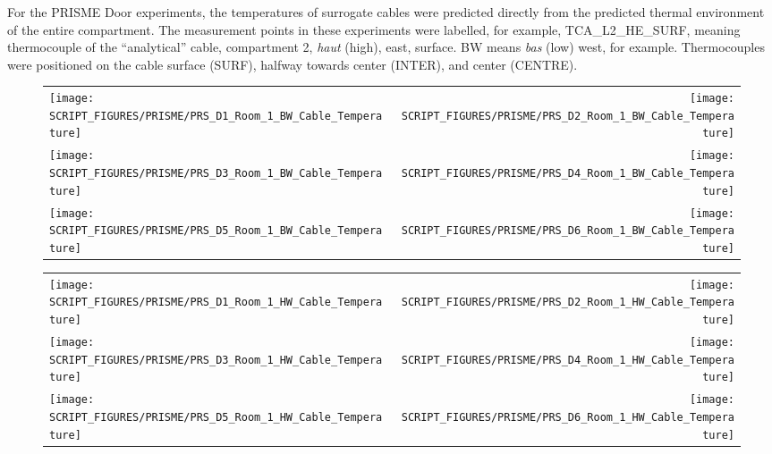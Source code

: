 \clearpage

For the PRISME Door experiments, the temperatures of surrogate cables were predicted directly from the predicted thermal environment of the entire compartment. The measurement points in these experiments were labelled, for example, TCA\_L2\_HE\_SURF, meaning thermocouple of the ``analytical'' cable, compartment 2, {\it haut} (high), east, surface. BW means {\it bas} (low) west, for example. Thermocouples were positioned on the cable surface (SURF), halfway towards center (INTER), and center (CENTRE).

\begin{figure}[p]
\begin{tabular*}{\textwidth}{l@{\extracolsep{\fill}}r}
\texttt{[image: SCRIPT\_FIGURES/PRISME/PRS\_D1\_Room\_1\_BW\_Cable\_Temperature]} &
\texttt{[image: SCRIPT\_FIGURES/PRISME/PRS\_D2\_Room\_1\_BW\_Cable\_Temperature]} \\
\texttt{[image: SCRIPT\_FIGURES/PRISME/PRS\_D3\_Room\_1\_BW\_Cable\_Temperature]} &
\texttt{[image: SCRIPT\_FIGURES/PRISME/PRS\_D4\_Room\_1\_BW\_Cable\_Temperature]} \\
\texttt{[image: SCRIPT\_FIGURES/PRISME/PRS\_D5\_Room\_1\_BW\_Cable\_Temperature]} &
\texttt{[image: SCRIPT\_FIGURES/PRISME/PRS\_D6\_Room\_1\_BW\_Cable\_Temperature]}
\end{tabular*}
\label{PRISME_BW_Cable_Room_1}
\end{figure}

\begin{figure}[p]
\begin{tabular*}{\textwidth}{l@{\extracolsep{\fill}}r}
\texttt{[image: SCRIPT\_FIGURES/PRISME/PRS\_D1\_Room\_1\_HW\_Cable\_Temperature]} &
\texttt{[image: SCRIPT\_FIGURES/PRISME/PRS\_D2\_Room\_1\_HW\_Cable\_Temperature]} \\
\texttt{[image: SCRIPT\_FIGURES/PRISME/PRS\_D3\_Room\_1\_HW\_Cable\_Temperature]} &
\texttt{[image: SCRIPT\_FIGURES/PRISME/PRS\_D4\_Room\_1\_HW\_Cable\_Temperature]} \\
\texttt{[image: SCRIPT\_FIGURES/PRISME/PRS\_D5\_Room\_1\_HW\_Cable\_Temperature]} &
\texttt{[image: SCRIPT\_FIGURES/PRISME/PRS\_D6\_Room\_1\_HW\_Cable\_Temperature]}
\end{tabular*}
\label{PRISME_HW_Cable_Room_1}
\end{figure}


